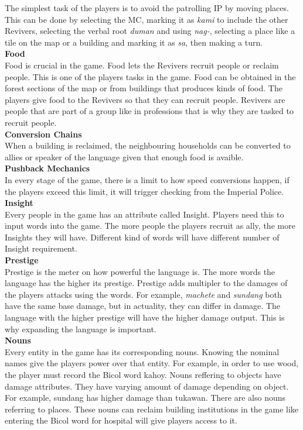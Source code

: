 \documentclass[11pt]{article}
\begin{document}
The simplest task of the players is to avoid the patrolling IP by moving places. This can be done by selecting the MC, marking it as \textit{kami} to include the other Revivers, selecting the verbal root \textit{duman} and using \textit{nag-}, selecting a place like a tile on the map or a building and marking it as \textit{sa}, then making a turn.\\

\textbf{Food}\\
Food is crucial in the game. Food lets the Revivers recruit people or reclaim people. This is one of the players tasks in the game. Food can be obtained in the forest sections of the map or from buildings that produces kinds of food. The players give food to the Revivers so that they can recruit people. Revivers are people that are part of a group like in professions that is why they are tasked to recruit people.\\

\textbf{Conversion Chains}\\
When a building is reclaimed, the neighbouring households can be converted to allies or speaker of the language given that enough food is avaible.\\

\textbf{Pushback Mechanics}\\
In every stage of the game, there is a limit to how speed conversions happen, if the players exceed this limit, it will trigger checking from the Imperial Police.\\

\textbf{Insight}\\
Every people in the game has an attribute called Insight. Players need this to input words into the game. The more people the players recruit as ally, the more Insights they will have. Different kind of words will have different number of Insight requirement.\\

\textbf{Prestige}\\
Prestige  is the meter on how powerful the language is. The more words the language has the higher its prestige. Prestige adds multipler to the damages of the players attacks using the words. For example, \textit{machete} and \textit{sundang} both have the same base damage, but in actuality, they can differ in damage. The language with the higher prestige will have the higher damage output. This is why expanding the language is important.\\

\textbf{Nouns}\\
Every entity in the game has its corresponding nouns. Knowing the nominal names give the players power over that entity. For example, in order to use wood, the player must record the Bicol word kahoy. Nouns reffering to objects have damage attributes. They have varying amount of damage depending on object. For example, sundang has higher damage than tukawan.
There are also nouns referring to places. These nouns can reclaim building institutions in the game like entering the Bicol word for hospital will give players access to it.
\end{document}
